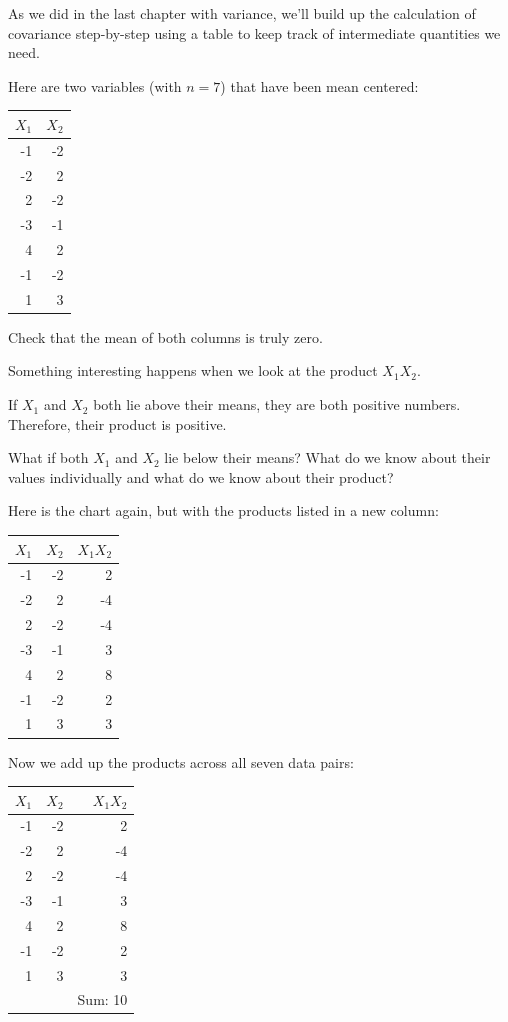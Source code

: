 \documentclass[
]{book}
\begin{document}
As we did in the last chapter with variance, we'll build up the calculation of covariance step-by-step using a table to keep track of intermediate quantities we need.

Here are two variables (with \(n = 7\)) that have been mean centered:

\begin{longtable}[]{@{}rr@{}}
\toprule
\(X_{1}\) & \(X_{2}\) \\
\midrule
\endhead
-1 & -2 \\
-2 & 2 \\
2 & -2 \\
-3 & -1 \\
4 & 2 \\
-1 & -2 \\
1 & 3 \\
\bottomrule
\end{longtable}

Check that the mean of both columns is truly zero.

Something interesting happens when we look at the product \(X_{1}X_{2}\).

If \(X_{1}\) and \(X_{2}\) both lie above their means, they are both positive numbers. Therefore, their product is positive.

What if both \(X_{1}\) and \(X_{2}\) lie below their means? What do we know about their values individually and what do we know about their product?

Here is the chart again, but with the products listed in a new column:

\begin{longtable}[]{@{}rrr@{}}
\toprule
\(X_{1}\) & \(X_{2}\) & \(X_{1}X_{2}\) \\
\midrule
\endhead
-1 & -2 & 2 \\
-2 & 2 & -4 \\
2 & -2 & -4 \\
-3 & -1 & 3 \\
4 & 2 & 8 \\
-1 & -2 & 2 \\
1 & 3 & 3 \\
\bottomrule
\end{longtable}

Now we add up the products across all seven data pairs:

\begin{longtable}[]{@{}rrr@{}}
\toprule
\(X_{1}\) & \(X_{2}\) & \(X_{1}X_{2}\) \\
\midrule
\endhead
-1 & -2 & 2 \\
-2 & 2 & -4 \\
2 & -2 & -4 \\
-3 & -1 & 3 \\
4 & 2 & 8 \\
-1 & -2 & 2 \\
1 & 3 & 3 \\
& & Sum: 10 \\
\bottomrule
\end{longtable}
\end{document}
